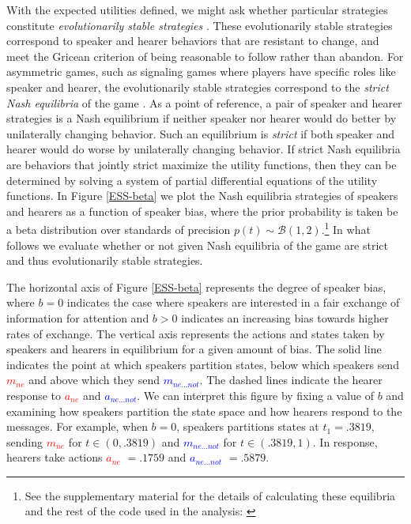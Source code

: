 \documentclass[linguex]{sp}
\theoremstyle{definition} \newtheorem{definition}{Definition}
\begin{document}
With the expected utilities defined, we might ask whether particular strategies constitute \emph{evolutionarily stable strategies} \citep{maynard-smith1982}. These evolutionarily stable strategies correspond to speaker and hearer behaviors that are resistant to change, and meet the Gricean criterion of being reasonable to follow rather than abandon. For asymmetric games, such as signaling games where players have specific roles like speaker and hearer, the evolutionarily stable strategies correspond to the \emph{strict Nash equilibria} of the game \citep{selten:1980}.  As a point of reference, a pair of speaker and hearer strategies is a Nash equilibrium if neither speaker nor hearer would do better by unilaterally changing behavior. Such an equilibrium is \emph{strict} if both speaker and hearer would do worse by unilaterally changing behavior.  If strict Nash equilibria are behaviors that jointly strict maximize the utility functions, then they can be determined by solving a system of partial differential equations of the utility functions. In Figure \ref{ESS-beta} we plot the Nash equilibria strategies of speakers and hearers as a function of speaker bias, where the prior probability is taken be a beta distribution over standards of precision $p(t) \sim \mathcal{B}(1,2)$.\footnote{See the supplementary material for the details of calculating these equilibria and the rest of the code used in the analysis: \url{}} In what follows we evaluate whether or not given Nash equilibria of the game are strict and thus evolutionarily stable strategies.

The horizontal axis of Figure \ref{ESS-beta} represents the degree of speaker bias, where $b=0$ indicates the case where speakers are interested in a fair exchange of information for attention and $b > 0$ indicates an increasing bias towards higher rates of exchange. The vertical axis represents the actions and states taken by speakers and hearers in equilibrium for a given amount of bias. The solid line indicates the point at which speakers partition states, below which speakers send \emph{\textcolor{red}{$m_{ne}$}} and above which they send \emph{\textcolor{blue}{$m_{ne...not}$}}. The dashed lines indicate the hearer response to  \emph{\textcolor{red}{$a_{ne}$}} and \emph{\textcolor{blue}{$a_{ne...not}$}}. We can interpret this figure by fixing a value of $b$ and examining how speakers partition the state space and how hearers respond to the messages. For example, when $b=0$, speakers partitions states at $t_1 = .3819$, sending \emph{\textcolor{red}{$m_{ne}$}} for $t \in (0, .3819)$ and \emph{\textcolor{blue}{$m_{ne...not}$}} for $t \in (.3819, 1)$. In response, hearers take actions \emph{\textcolor{red}{$a_{ne}$}} $=.1759$ and \emph{\textcolor{blue}{$a_{ne...not}$}} $ =.5879$. 
\end{document}
